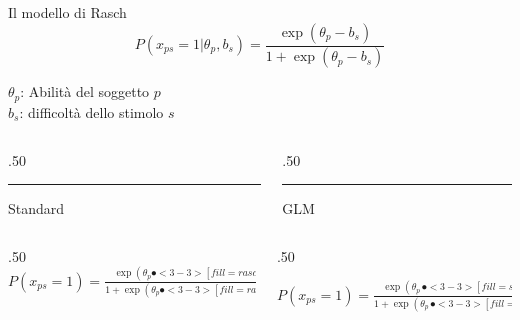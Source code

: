 \documentclass[compress]{beamer}
\begin{document}
\begin{frame}{Il modello di Rasch}
	\begin{equation*}
		P(x_{ps} = 1| \theta_p, b_s) = \dfrac{\exp( \theta_p - b_s)}{1 + \exp(\theta_p - b_s)}
	\end{equation*}
	
	$\theta_p$: Abilità del soggetto $p$ \\
	$b_s$: difficoltà dello stimolo $s$\\
	
	\vspace{2.5mm}
	\onslide<2-> 
	\begin{columns}[T] %
		\begin{column}{.50\linewidth}
			\textcolor{diff}{\rule{\linewidth}{2pt}}
			\begin{center}
				\textcolor{diff}{	\large{{Standard}}}
			\end{center}
			
		\end{column}
		
		\hfill%
		\begin{column}{.50\linewidth}
			\textcolor{single}{\rule{\linewidth}{2pt}}
			\begin{center}
				\textcolor{single}{\large{{GLM}}}	
			\end{center}
			
		\end{column}%
	\end{columns}
	
	\vspace{2.5mm}
	\begin{columns}[T]
		\begin{column}{.50\linewidth}
			\vspace*{2.5mm}
			$P(x_{ps} = 1) = \displaystyle \frac{\exp(\theta_p \spot<3-3>[fill=rasch!50]{-} b_s)}{1 + \exp(\theta_p \spot<3-3>[fill=rasch!50]{-} b_s)}$
		\end{column}
		\hfill
		
		\begin{column}{.50\linewidth}
			
			\vspace*{2.5mm}
			$P(x_{ps} = 1) = \displaystyle \frac{\exp(\theta_p \, \spot<3-3>[fill=single!50]{+} \, b_s)}{1 + \exp(\theta_p \, \spot<3-3>[fill=single!50]{+} \, b_s)}$
		\end{column}
	\end{columns}	
	
\end{frame}
\end{document}
